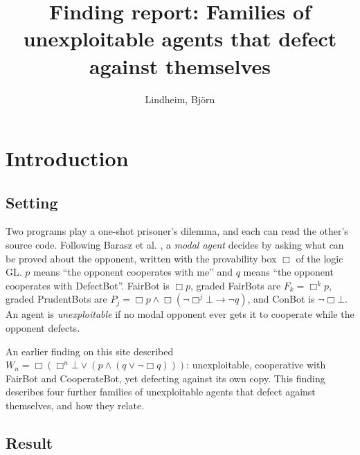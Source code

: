 \documentclass{article}
\title{Finding report: Families of unexploitable agents that defect against themselves}
\author{Lindheim, Björn}
\date{}
\begin{document}
\maketitle
\section{Introduction}
\label{sec:gate-families}

\subsection*{Setting}

Two programs play a one-shot prisoner's dilemma, and each can read the other's source code.
Following Barasz et al. \cite{barasz2014robust}, a \emph{modal agent} decides by asking what can be proved
about the opponent, written with the provability box $\Box$ of the logic GL. $p$ means ``the
opponent cooperates with me'' and $q$ means ``the opponent cooperates with DefectBot''. FairBot is
$\Box p$, graded FairBots are $F_k = \Box^k p$, graded PrudentBots are
$P_j = \Box p \wedge \Box(\neg\Box^j\bot \to \neg q)$, and ConBot is $\neg\Box\bot$. An agent is
\emph{unexploitable} if no modal opponent ever gets it to cooperate while the opponent defects.

An earlier finding on this site described $W_n = \Box(\Box^n\bot \vee (p \wedge (q \vee \neg\Box q)))$: unexploitable, cooperative with FairBot and CooperateBot, yet defecting against
its own copy. This finding describes four further families of unexploitable agents that defect against
themselves, and how they relate.

\subsection*{Result}
\end{document}
